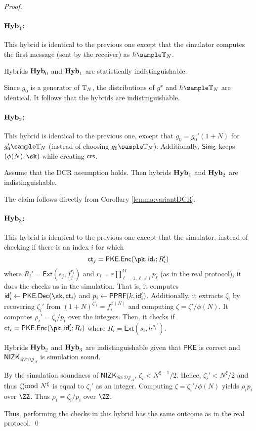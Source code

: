 \begin{proof}
\paragraph{$\mathsf{\mathbf{Hyb}}_1$:} This hybrid is identical to the previous one except that the simulator computes the first message (sent by the receiver) as $h\sample\TT_N$.

\begin{claim}
Hybrids $\mathsf{\mathbf{Hyb}}_0$ and $\mathsf{\mathbf{Hyb}}_1$ are statistically indistinguishable.
\end{claim}
Since $g_0$ is a generator of $\mathbb{T}_N$, the distributions of $g^x$ and $h\sample \TT_N$ are identical. It follows that the hybrids are indistinguishable.


\paragraph{$\mathsf{\mathbf{Hyb}}_2$:} This hybrid is identical to the previous one, except that $g_0=g_0'(1+N)$ for $g_0'\sample \TT_N$ (instead of choosing $g_0\sample \TT_N$). Additionally, $\mathsf{Sim}_{\mathsf{S}}$ keeps $(\phi(N),\sk)$ while creating $\mathsf{crs}$. %

\begin{claim}
Assume that the DCR assumption holds. Then hybrids $\mathsf{\mathbf{Hyb}}_1$ and $\mathsf{\mathbf{Hyb}}_2$ are indistinguishable.
\end{claim}
 The claim follows directly from Corollary \ref{lemma:variantDCR}.

\paragraph{$\mathsf{\mathbf{Hyb}}_3$:} This hybrid is identical to the previous one except that the simulator, instead of checking if there is an index $i$ for which $$\ct_j=\mathsf{PKE.Enc}(\pk,\id_i;R'_i)$$ where $R_i'=\mathsf{Ext}(s_j,f_j^{r_i})$ and $r_i={r \displaystyle\prod_{
         \ell=1,
        \ell\neq i
     }^M p_\ell}$ (as in the real protocol), it does the checks as in the simulation. That is, it computes $\id'_i\leftarrow\mathsf{PKE.Dec}(\sk,\ct_i)$ and $p_i\leftarrow\mathsf{PPRF}(k,\mathsf{id}'_i)$. Additionally, it extracts $\zeta_i$ by  recovering $ \zeta_i'$ from $(1+N)^{\zeta'_i}=f_i^{\phi(N)}$ and computing $\zeta=\zeta'/\phi(N)$. It computes $\rho_i'=\zeta_i/p_i$ over the integers. Then, it checks if $\ct_i=\mathsf{PKE.Enc}(\pk,\id'_i;R_i)$ where $R_i=\mathsf{Ext}(s_i,h^{\rho_i'})$.
     
\begin{claim}
Hybrids $\mathsf{\mathbf{Hyb}}_2$ and $\mathsf{\mathbf{Hyb}}_3$ are indistinguishable given that $\mathsf{PKE}$ is correct and $\mathsf{NIZK}_{\mathcal{REDJ}_\Delta}$ is simulation sound.
\end{claim}     

By the simulation soundness of $\mathsf{NIZK}_{\mathcal{REDJ}_\Delta}$, $\zeta_i<N^{\xi-1}/2$. Hence, $\zeta_i'<N^\xi/2$ and thus $\zeta_i'\!\!\!\!\mod N^\xi$ is equal to $\zeta_i'$ as an integer. Computing $\zeta=\zeta_i'/\phi(N)$ yields $\rho_i p_i$ over $\ZZ$. Thus $\rho_i=\zeta_i/p_i$ over $\ZZ$.

Thus, performing the checks in this hybrid has the same outcome as in the real protocol.
\qed
\end{proof}
